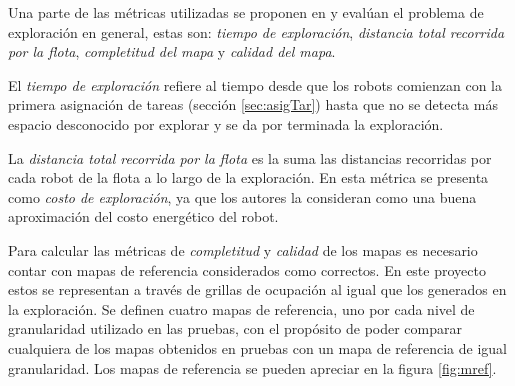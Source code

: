 Una parte de las métricas utilizadas se proponen en \cite{yan2015metrics} y
evalúan el problema de exploración en general, estas son: \emph{tiempo de
exploración}, \emph{distancia total recorrida por la flota}, \emph{completitud
del mapa} y \emph{calidad del mapa}. 

El \emph{tiempo de exploración} refiere al tiempo desde que los robots
comienzan con la primera asignación de tareas (sección \ref{sec:asigTar}) hasta
que no se detecta más espacio desconocido por explorar y se da por terminada la exploración.

La \emph{distancia total recorrida por la flota} es la suma las distancias
recorridas por cada robot de la flota a lo largo de la exploración. En
\cite{yan2015metrics} esta métrica se presenta como \emph{costo de
exploración}, ya que los autores la consideran como una buena aproximación del
costo energético del robot. 


Para calcular las métricas de \emph{completitud} y \emph{calidad} de los mapas
es necesario contar con mapas de referencia considerados como correctos. En
este proyecto estos se representan a través de grillas de ocupación al igual
que los generados en la exploración. Se definen cuatro mapas de
referencia, uno por cada nivel de granularidad utilizado en las pruebas, con el
propósito de poder comparar cualquiera de los mapas obtenidos en pruebas con
un mapa de referencia de igual granularidad. Los mapas de referencia se pueden
apreciar en la figura \ref{fig:mref}. 

